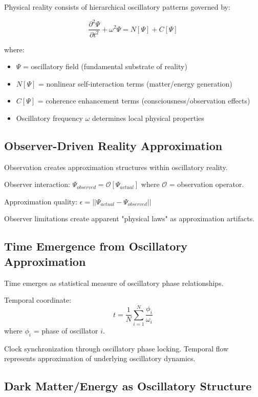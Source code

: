 \documentclass[12pt,a4paper]{article}
\begin{document}
Physical reality consists of hierarchical oscillatory patterns governed by:

\begin{equation}
\frac{\partial^2\Psi}{\partial t^2} + \omega^2\Psi = N[\Psi] + C[\Psi]
\end{equation}

where:
\begin{itemize}
\item $\Psi$ = oscillatory field (fundamental substrate of reality)
\item $N[\Psi]$ = nonlinear self-interaction terms (matter/energy generation)
\item $C[\Psi]$ = coherence enhancement terms (consciousness/observation effects)
\item Oscillatory frequency $\omega$ determines local physical properties
\end{itemize}

\subsection{Observer-Driven Reality Approximation}

Observation creates approximation structures within oscillatory reality.

Observer interaction: $\Psi_{observed} = \mathcal{O}[\Psi_{actual}]$ where $\mathcal{O}$ = observation operator.

Approximation quality: $\epsilon = ||\Psi_{actual} - \Psi_{observed}||$

Observer limitations create apparent "physical laws" as approximation artifacts.

\subsection{Time Emergence from Oscillatory Approximation}

Time emerges as statistical measure of oscillatory phase relationships.

Temporal coordinate:
\begin{equation}
t = \frac{1}{N} \sum_{i=1}^{N} \frac{\phi_i}{\omega_i}
\end{equation}
where $\phi_i$ = phase of oscillator $i$.

Clock synchronization through oscillatory phase locking. Temporal flow represents approximation of underlying oscillatory dynamics.

\subsection{Dark Matter/Energy as Oscillatory Structure}
\end{document}
